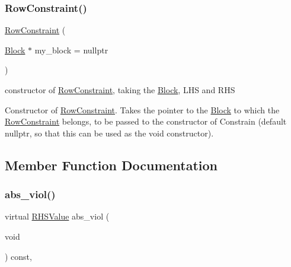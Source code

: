 \subsubsection{\texorpdfstring{Row\+Constraint()}{RowConstraint()}}
{\footnotesize\ttfamily \mbox{\hyperlink{class_s_m_spp__di__unipi__it_1_1_row_constraint}{Row\+Constraint}} (\begin{DoxyParamCaption}\item[{\mbox{\hyperlink{class_s_m_spp__di__unipi__it_1_1_block}{Block}} $\ast$}]{my\+\_\+block = {\ttfamily nullptr} }\end{DoxyParamCaption})\hspace{0.3cm}{\ttfamily [inline]}}



constructor of \mbox{\hyperlink{class_s_m_spp__di__unipi__it_1_1_row_constraint}{Row\+Constraint}}, taking the \mbox{\hyperlink{class_s_m_spp__di__unipi__it_1_1_block}{Block}}, L\+HS and R\+HS 

Constructor of \mbox{\hyperlink{class_s_m_spp__di__unipi__it_1_1_row_constraint}{Row\+Constraint}}. Takes the pointer to the \mbox{\hyperlink{class_s_m_spp__di__unipi__it_1_1_block}{Block}} to which the \mbox{\hyperlink{class_s_m_spp__di__unipi__it_1_1_row_constraint}{Row\+Constraint}} belongs, to be passed to the constructor of Constrain (default nullptr, so that this can be used as the void constructor). 

\subsection{Member Function Documentation}
\mbox{\label{class_s_m_spp__di__unipi__it_1_1_row_constraint_a4207e8720a4543e4840b795a3d97b4e0}} 
\subsubsection{\texorpdfstring{abs\+\_\+viol()}{abs\_viol()}}
{\footnotesize\ttfamily virtual \mbox{\hyperlink{class_s_m_spp__di__unipi__it_1_1_row_constraint_a8813536ab3b13a81c8e83a999ade3bd8}{R\+H\+S\+Value}} abs\+\_\+viol (\begin{DoxyParamCaption}\item[{void}]{ }\end{DoxyParamCaption}) const\hspace{0.3cm}{\ttfamily [inline]}, {\ttfamily [virtual]}}



